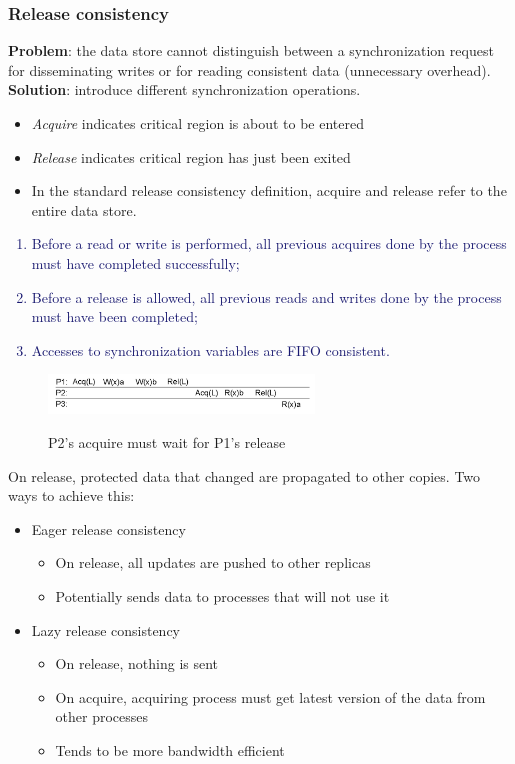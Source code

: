 \documentclass[10pt,a4paper]{article}
\begin{document}
\subsubsection{Release consistency}
\textbf{Problem}: the data store cannot distinguish between a synchronization request for disseminating writes or for reading consistent data (unnecessary overhead). \\
\textbf{Solution}: introduce different synchronization operations. 
\begin{itemize}
	\item \textit{Acquire} indicates critical region is about to be entered
	\item \textit{Release} indicates critical region has just been exited
	\item In the standard release consistency definition, acquire and release refer to the entire data store.
\end{itemize}
\textcolor{MidnightBlue}{
\begin{enumerate}
	\item Before a read or write is performed, all previous acquires done by the process must have completed successfully;
	\item Before a release is allowed, all previous reads and writes done by the process must have been completed;
	\item Accesses to synchronization variables are FIFO consistent.
\end{enumerate}}
\begin{figure}[h!]
 \hfill \includegraphics[width=200pt]{images/release.png}\hspace*{\fill}
  \label{fig:release}
  \caption{P2's acquire must wait for P1's release}
\end{figure}
On release, protected data that changed are propagated to other copies. Two ways to achieve this:
\begin{itemize}
	\item Eager release consistency
	\begin{itemize}
		\item On release, all updates are pushed to other replicas
		\item Potentially sends data to processes that will not use it
	\end{itemize}
	\item Lazy release consistency
	\begin{itemize}
		\item On release, nothing is sent
		\item On acquire, acquiring process must get latest version of the data from other processes
		\item Tends to be more bandwidth efficient
	\end{itemize}
\end{itemize}
\end{document}
